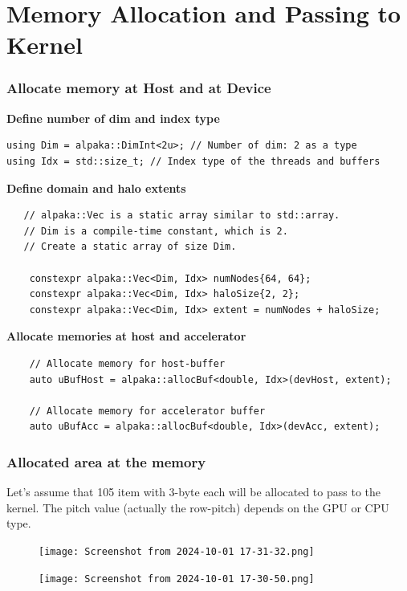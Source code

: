 \documentclass[9pt]{beamer}
\begin{document}

\section{Memory Allocation and Passing to Kernel}


 \begin{frame}[fragile]
\frametitle{Allocate memory at Host and at Device}

\textbf{Define number of dim and index type}
\begin{lstlisting}
using Dim = alpaka::DimInt<2u>; // Number of dim: 2 as a type
using Idx = std::size_t; // Index type of the threads and buffers
 \end{lstlisting}

\textbf{Define domain and halo extents}
\begin{lstlisting}
   // alpaka::Vec is a static array similar to std::array.
   // Dim is a compile-time constant, which is 2.
   // Create a static array of size Dim.

    constexpr alpaka::Vec<Dim, Idx> numNodes{64, 64};
    constexpr alpaka::Vec<Dim, Idx> haloSize{2, 2};
    constexpr alpaka::Vec<Dim, Idx> extent = numNodes + haloSize;
\end{lstlisting}

\textbf{Allocate memories at host and accelerator}
\begin{lstlisting}
    // Allocate memory for host-buffer
    auto uBufHost = alpaka::allocBuf<double, Idx>(devHost, extent);

    // Allocate memory for accelerator buffer
    auto uBufAcc = alpaka::allocBuf<double, Idx>(devAcc, extent);
\end{lstlisting}
\end{frame}

\begin{frame}[fragile]
\frametitle{Allocated area at the memory}
\hspace{-0.4\baselineskip}
\small
Let's assume that 105 item with 3-byte each will be allocated to pass to the kernel. The pitch value (actually the row-pitch) depends on the GPU or CPU type.

\begin{figure}
\hspace{-1.2\baselineskip}
   \centering
   \texttt{[image: Screenshot from 2024-10-01 17-31-32.png]}
   \label{fig:enter-label}
\end{figure}
\hspace{0.1\baselineskip}
\begin{figure}
\hspace{-1.2\baselineskip}
   \centering
   \texttt{[image: Screenshot from 2024-10-01 17-30-50.png]}
   \label{fig:enter-label}
\end{figure}
\end{frame}
\end{document}
